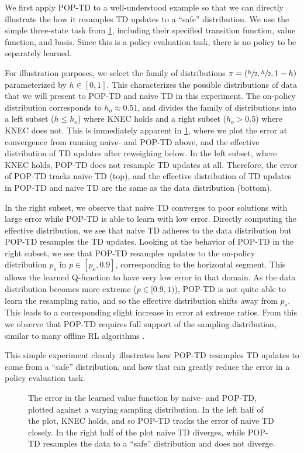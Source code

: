 We first apply POP-TD to a well-understood example so that we can directly illustrate the how it resamples TD updates to a ``safe'' distribution. We use the simple three-state task from \cref{fig:threestate}, including their specified transition function, value function, and basis. Since this is a policy evaluation task, there is no policy to be separately learned.

For illustration purposes, we select the family of distributions $\pi = (\sfrac h 2, \sfrac h 2, 1- h)$ parameterized by $h \in [0, 1]$.
This characterizes the possible distributions of data that we will present to POP-TD and naive TD in this experiment. The on-policy distribution corresponds to $h_o\approx 0.51$, and divides the family of distributions into a left subset ($h \leq h_o$) where KNEC holds and a right subset ($h_o > 0.5$) where KNEC does not. This is immediately apparent in \cref{fig:threestate}, where we plot the error at convergence from running naive- and POP-TD above, and the effective distribution of TD updates after reweighing below.
In the left subset, where KNEC holds, POP-TD does not resample TD updates at all. Therefore, the error of POP-TD tracks naive TD (top), and the effective distribution of TD updates in POP-TD and naive TD are the same as the data distribution (bottom).

In the right subset, we observe that naive TD converges to poor solutions with large error while POP-TD is able to learn with low error.
Directly computing the effective distribution, we see that naive TD adheres to the data distribution but POP-TD resamples the TD updates.
Looking at the behavior of POP-TD in the right subset, we see that POP-TD resamples updates to the on-policy distribution $p_o$ in $p\in[p_o,0.9]$, corresponding to the horizontal segment. This allows the learned Q-function to have very low error in that domain. As the data distribution becomes more extreme ($p\in [0.9, 1)$), POP-TD is not quite able to learn the resampling ratio, and so the effective distribution shifts away from $p_o$. This leads to a corresponding slight increase in error at extreme ratios. From this we observe that POP-TD requires full support of the sampling distribution, similar to many offline RL algorithms \cite{kumar2020cql,shi2022pessimistic}.

This simple experiment cleanly illustrates how POP-TD resamples TD updates to come from a ``safe'' distribution, and how that can greatly reduce the error in a policy evaluation task.

\label{sec:threestateexp}
\begin{figure}[t]
  \centering
  
  \caption{The error in the learned value function by naive- and POP-TD, plotted against a varying sampling distribution. In the left half of the plot, KNEC holds, and so POP-TD tracks the error of naive TD closely. In the right half of the plot naive TD diverges, while POP-TD resamples the data to a ``safe'' distribution and does not diverge. }
  \label{fig:threestate}
\end{figure}



